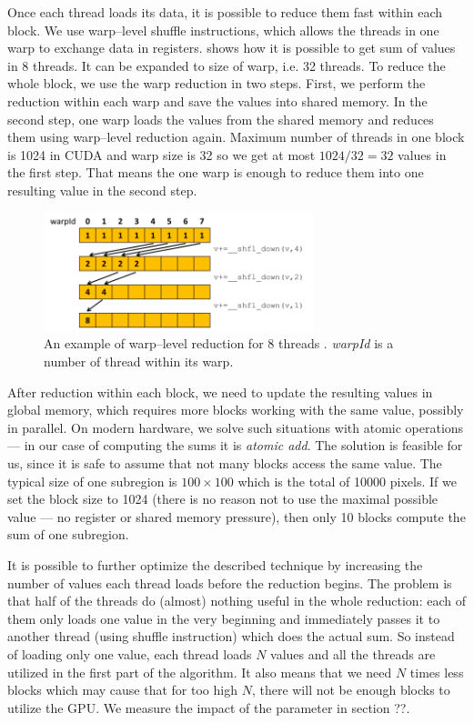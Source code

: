 Once each thread loads its data, it is possible to reduce them fast within each block. We use warp--level shuffle instructions, which allows the threads in one warp to exchange data in registers.  shows how it is possible to get sum of values in 8 threads. It can be expanded to size of warp, i.e. 32 threads. To reduce the whole block, we use the warp reduction in two steps. First, we perform the reduction within each warp and save the values into shared memory. In the second step, one warp loads the values from the shared memory and reduces them using warp--level reduction again. Maximum number of threads in one block is 1024 in CUDA and warp size is 32 so we get at most $1024/32 = 32$ values in the first step. That means the one warp is enough to reduce them into one resulting value in the second step.

\begin{figure}
	\centering
	\includegraphics[width=0.7\textwidth]{img/warp_reduce}
	\caption{An example of warp--level reduction for 8 threads \cite{parallelReduction}. \emph{warpId} is a number of thread within its warp.}
	\label{warp_reduce}
\end{figure}

After reduction within each block, we need to update the resulting values in global memory, which requires more blocks working with the same value, possibly in parallel. On modern hardware, we solve such situations with atomic operations --- in our case of computing the sums it is \emph{atomic add}. The solution is feasible for us, since it is safe to assume that not many blocks access the same value. The typical size of one subregion is $100 \times 100$ which is the total of 10000 pixels. If we set the block size to 1024 (there is no reason not to use the maximal possible value --- no register or shared memory pressure), then only 10 blocks compute the sum of one subregion.

It is possible to further optimize the described technique by increasing the number of values each thread loads before the reduction begins. The problem is that half of the threads do (almost) nothing useful in the whole reduction: each of them only loads one value in the very beginning and immediately passes it to another thread (using shuffle instruction) which does the actual sum. So instead of loading only one value, each thread loads $N$ values and all the threads are utilized in the first part of the algorithm. It also means that we need $N$ times less blocks which may cause that for too high $N$, there will not be enough blocks to utilize the GPU. We measure the impact of the parameter in section ??.

